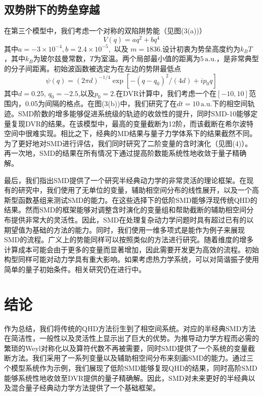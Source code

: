 \subsection{双势阱下的势垒穿越}
在第三个模型中，我们考虑一个对称的双陷阱势能（见图(3(a))）
\begin{equation}
	V(q)=a q^{2}+b q^{4}
\end{equation}
其中$a=-3 \times 10^{-4}, b=2.4 \times 10^{-5}, \text { 以及 } m=1836$.设计初衷为势垒高度约为$k_B T$，其中$k_B$为玻尔兹曼常数，$T$为室温。两个局部最小值的距离为$5 \, \mathrm{a.u.}$，是非常典型的分子间距离。初始波函数被选定为在左边的势阱最低点
\begin{equation}
	\psi(q)=(2 \pi d)^{-1 / 4} \exp \left[-\left(q-q_{0}\right)^{2} /(4 d)+i p_{0} q\right]
\end{equation}
其中$d=0.25$, $q_0=-2.5$,以及$p_0=2$.在DVR计算中，我们考虑一个在$[-10,10]$范围内，0.05为间隔的格点。在图(3(b))中，我们研究了在$dt=10 \, \mathrm{a.u.}$下的相空间轨迹。SMD阶数的增多能够促进系统级的轨迹的收敛性的提升，同时SMD-10能够定量复现DVR的结果。在该模型中，最高的变量截断为12阶，而该截断在希尔波特空间中很难实现。相比之下，经典的MD结果与量子力学体系下的结果截然不同。为了更好地对SMD进行评估，我们同时研究了二阶变量的含时演化（见图(4)）。再一次地，SMD的结果在所有情况下通过提高阶数能系统性地收敛于量子精确解。

最后，我们指出SMD提供了一个研究半经典动力学的非常灵活的理论框架。在现有的研究中，我们使用了无单位的变量，辅助相空间分布的线性展开，以及一个高斯型函数基组来测试SMD的能力。在这些选择下的低阶SMD能够浮现传统QHD的结果。然而SMD的框架能够对调整含时演化的变量组和帮助截断的辅助相空间分布提供非常大的灵活性。因此，SMD在处理复杂动力学问题时具有超过已有的以期望值为基础的方法的能力。同时，我们使用一维多项式是能作为例子来展现SMD的流程。广义上的势能同样可以按照类似的方法进行研究。随着维度的增多计算成本可能会由于更多的变量而显著增加，因此需要开发更为高效的流程。初始构型同样可能对动力学具有重大影响。如果考虑热力学系统，可以对简谐振子使用简单的量子初始条件。相关研究仍在进行中。

\section{结论}
作为总结，我们将传统的QHD方法衍生到了相空间系统。对应的半经典SMD方法在简洁性，一般性以及灵活性上显示出了巨大的优势。为推导动力学方程而必需的繁琐的Weyl对称化以及算符代数不再被需要，同时SMD提供了一个系统的变量截断方法。我们采用了一系列变量以及辅助相空间分布来刻画SMD的能力。通过三个模型系统作为示例，我们展现了低阶SMD能够复现QHD的结果，同时高阶SMD能够系统性地收敛至DVR提供的量子精确解。因此，SMD对未来更好的半经典以及混合量子经典动力学方法提供了一个基础框架。

